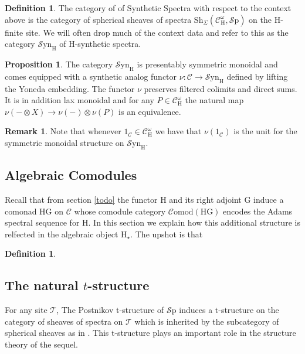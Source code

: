 \documentclass[10pt]{amsart}
\theoremstyle{definition}
\numberwithin{figure}{section}
\numberwithin{equation}{section}
\newtheorem{proposition}[figure]{Proposition}
\newtheorem{definition}[figure]{Definition}
\newtheorem{remark}[figure]{Remark}
\newcommand{\cC}{\mathcal{C}}
\newcommand{\cT}{\mathcal{T}}
\newcommand{\one}{\mathrm{1}}
\theoremstyle{cited}
\newcommand{\Sp}{{\mathcal{S}\mathrm{p}}}
\newcommand{\Sh}{\mathrm{Sh}}
\newcommand{\Syn}{\mathcal{S}\mathrm{yn}}
\renewcommand{\H}{\mathrm{H}}
\newcommand{\G}{\mathrm{G}}
\newcommand{\Comod}{\mathcal{C}\mathrm{omod}}
\begin{document}
\begin{definition}
  The category of of Synthetic Spectra with respect to the context above is the category of spherical sheaves of spectra $\Sh_\Sigma(\cC^\omega_\H, \Sp)$ on the $\H$-finite site. We will often drop much of the context data and refer to this as the category $\Syn_\H$ of $\H$-synthetic spectra.
\end{definition}

\begin{proposition}
  The category $\Syn_\H$ is presentably symmetric monoidal and comes equipped with a synthetic analog functor $\nu:\cC\to \Syn_\H$ defined by lifting the Yoneda embedding. The functor $\nu$ preserves filtered colimits and direct sums. It is in addition lax monoidal and for any $P\in \cC^\omega_\H$ the natural map $\nu(-\otimes X)\to \nu(-)\otimes \nu(P)$ is an equivalence.
\end{proposition}

\begin{remark}
  Note that whenever $\one_{\cC}\in \cC^\omega_\H$ we have that $\nu(\one_{\cC})$ is the unit for the symmetric monoidal structure on $\Syn_{\H}$.
\end{remark}

\subsection{Algebraic Comodules}

Recall that from section \ref{todo} the functor $\H$ and its right adjoint $\G$ induce a comonad $\H\G$ on $\cC$ whose comodule category $\Comod(\H\G)$ encodes the Adams spectral sequence for $\H$. In this section we explain how this additional structure is relfected in the algebraic object $\H_\star$. The upshot is that 

\begin{definition}
  
\end{definition}

\subsection{The natural $t$-structure}

For any site $\cT$, The Postnikov t-structure of $\Sp$ induces a t-structure on the category of sheaves of spectra on $\cT$ which is inherited by the subcategory of spherical sheaves as in \cite{todo}. This t-structure plays an important role in the structure theory of the sequel.
\end{document}
